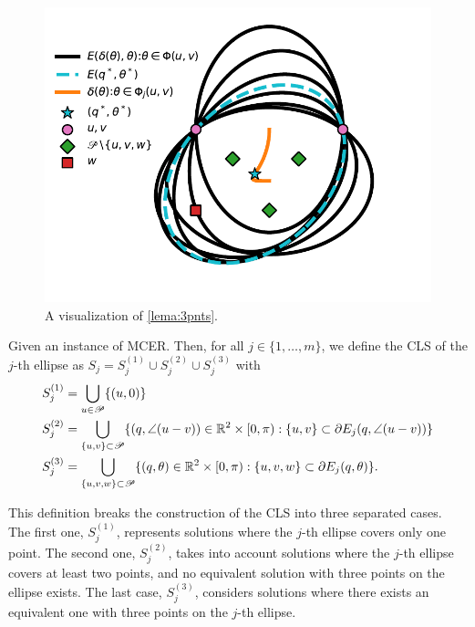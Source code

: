 \begin{figure}[H]
	\centering
	\includegraphics[scale=.7]{figures/lema-3-points}
	\caption{A visualization of \autoref{lema:3pnts}.}
	\label{fig:lema-3-points}
\end{figure}

\begin{definition}\label{def:Sj}
	Given an instance of MCER. Then, for all $j\in\{1, \dots, m\}$, we define the CLS of the $j$-th ellipse as $S_j = S_j^{(1)} \cup S_j^{(2)} \cup S_j^{(3)}$ with
	\begin{align*}
	S_j^{(1)} &= \bigcup_{u \in \mathscr{P}} \{(u, 0)\}\\
	S_j^{(2)} &= \bigcup_{\{u, v\} \subset \mathscr{P}} \{(q, \angle(u-v))\in \mathbb{R}^2\times[0, \pi): \{u,v\} \subset \partial E_j(q, \angle(u-v))\}\\
	S_j^{(3)} &= \bigcup_{\{u, v, w\} \subset \mathscr{P}} \{(q, \theta)\in \mathbb{R}^2\times[0, \pi): \{u, v, w\} \subset \partial E_j(q, \theta)\}.
	\end{align*}
\end{definition}

This definition breaks the construction of the CLS into three separated cases. The first one, $S_j^{(1)}$, represents solutions where the $j$-th ellipse covers only one point. The second one, $S_j^{(2)}$, takes into account solutions where the $j$-th ellipse covers at least two points, and no equivalent solution with three points on the ellipse exists. The last case, $S_j^{(3)}$, considers solutions where there exists an equivalent one with three points on the $j$-th ellipse. 

